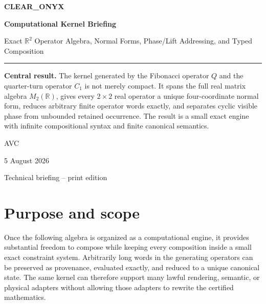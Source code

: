 \documentclass[11pt,letterpaper]{article}
\theoremstyle{clearonyx}
\newcommand{\R}{\mathbb{R}}
\begin{document}
\begin{titlepage}
\thispagestyle{empty}
\vspace*{0.12\textheight}

{\fontsize{34}{38}\selectfont\bfseries\color{onyx} CLEAR\_ONYX\par}
\vspace{0.75em}
{\fontsize{22}{27}\selectfont\bfseries Computational Kernel Briefing\par}
\vspace{0.75em}
{\large Exact $\R^2$ Operator Algebra, Normal Forms, Phase/Lift Addressing, and Typed Composition\par}

\vspace{2.4em}
\color{gold}\rule{0.56\textwidth}{1.1pt}\color{black}
\vspace{2.2em}

\begin{executivebox}
\textbf{Central result.}
The kernel generated by the Fibonacci operator $Q$ and the quarter-turn operator $C_1$ is not merely compact.  It spans the full real matrix algebra $M_2(\R)$, gives every $2\times2$ real operator a unique four-coordinate normal form, reduces arbitrary finite operator words exactly, and separates cyclic visible phase from unbounded retained occurrence.  The result is a small exact engine with infinite compositional syntax and finite canonical semantics.
\end{executivebox}

\vfill
{\large AVC\par}
{\large 5 August 2026\par}
\vspace{0.6em}
{\small Technical briefing -- print edition\par}
\end{titlepage}

\tableofcontents
\clearpage

\section{Purpose and scope}

Once the following algebra is organized as a computational engine, it provides substantial freedom to compose while keeping every composition inside a small exact constraint system.  Arbitrarily long words in the generating operators can be preserved as provenance, evaluated exactly, and reduced to a unique canonical state.  The same kernel can therefore support many lawful rendering, semantic, or physical adapters without allowing those adapters to rewrite the certified mathematics.
\end{document}
